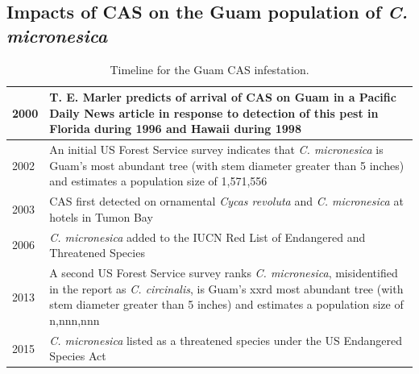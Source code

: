\documentclass[12pt,letterpaper,english,bibliography=totocnumbered, abstract=on]{scrartcl}
\begin{document}

\subsection{Impacts of CAS on the Guam population of \textit{C. micronesica}}

\begin{table}[p]
	\centering
	\label{tab:timeline}	
	\caption{Timeline for the Guam CAS infestation.}	
	\begin{tabular}{l>{\raggedright\arraybackslash}p{4.5in}}
		\hline
		2000 & T. E. Marler predicts of arrival of CAS on Guam in a Pacific Daily News article \parencite{haynesExoticInvasivePest2005} in response to detection of this pest in Florida during 1996 \parencite{howardAulacaspisYasumatsuiHemiptera1999a} and Hawaii during 1998 \parencite{heu2003sago}
		\\\hline
		2002 & An initial US Forest Service survey indicates that \textit{C. micronesica} is Guam's most abundant tree (with stem diameter greater than 5 inches) and estimates a population size of 1,571,556 \parencite{donnegon_guams_2004}
		\\\hline
		2003 & CAS first detected on ornamental \textit{Cycas revoluta} and \textit{C. micronesica} at hotels in Tumon Bay
		\\\hline
		2006 & \textit{C. micronesica} added to the IUCN Red List of Endangered and Threatened Species
		\\\hline
		2013 & A second US Forest Service survey ranks \textit{C. micronesica}, misidentified in the report as \textit{C. circinalis}, is Guam's xxrd most abundant tree (with stem diameter greater than 5 inches) and estimates a population size of n,nnn,nnn \parencite{lazaroGuamForestResources2020a}
		\\\hline
		2015 & \textit{C. micronesica} listed as a threatened species under the US Endangered Species Act \parencite{unitedstatesgovernmentEndangeredThreatenedWildlife2015}
		\\\hline
	\end{tabular}	
\end{table}
\end{document}

